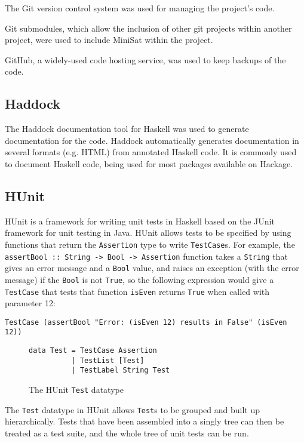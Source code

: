 \documentclass[12pt,a4paper,twoside,openright]{report}
\begin{document}
The Git version control system was used for managing the project's code.

Git submodules, which allow the inclusion of other git projects within another
project, were used to include MiniSat within the project.

GitHub, a widely-used code hosting service, was used to keep backups of the
code.

\subsection{Haddock}

The Haddock documentation tool for Haskell was used to generate documentation
for the code. Haddock automatically generates documentation in
several formats (e.g. HTML) from annotated Haskell code. It is commonly
used to document Haskell code, being used for most packages available
on Hackage.

\subsection{HUnit}
HUnit is a framework for writing unit tests in Haskell based on the JUnit framework
for unit testing in Java. HUnit allows tests to be specified by using functions
that return the \verb,Assertion, type to write \verb,TestCase,s. For example, the
\verb,assertBool :: String -> Bool -> Assertion, function takes a \verb,String,
that gives an error message and a \verb,Bool, value, and raises an exception (with
the error message) if the \verb,Bool, is not \verb,True,, so the following
expression would give a \verb,TestCase, that tests that function
\verb,isEven, returns \verb,True, when called with parameter 12:
\begin{verbatim}
TestCase (assertBool "Error: (isEven 12) results in False" (isEven 12))
\end{verbatim}

\begin{figure}[h]
\centering
\begin{verbatim}
data Test = TestCase Assertion
          | TestList [Test]
          | TestLabel String Test
\end{verbatim}
\caption{The HUnit {\tt Test} datatype}
\end{figure}

The \verb,Test, datatype in HUnit allows \verb,Test,s to be grouped
and built up hierarchically. Tests that have been assembled into a
singly tree can then be treated as a test suite, and the whole tree
of unit tests can be run.
\end{document}
